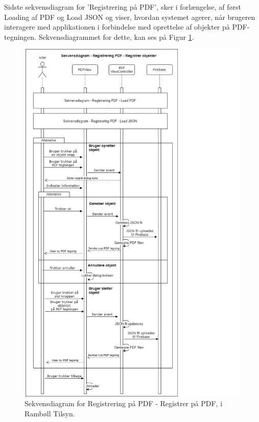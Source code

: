 Sidste sekvensdiagram for 'Registrering på PDF', sker i forlængelse, af først Loading af PDF og Load JSON og viser, hvordan systemet agerer, når brugeren interagere med applikationen i forbindelse med oprettelse af objekter på PDF-tegningen. Sekvensdiagrammet for dette, kan ses på Figur \ref{fig:RegistrerObjekterSekvensDiagram}.
\begin{figure}[H] %
	\centering
	\includegraphics[height=18cm, width=15cm]{Design/Applikation/RegistrePDF/RegistrerObjekterSekvensDiagram}
	\caption{Sekvensdiagram for Registrering på PDF - Registrer på PDF, i Rambøll Tilsyn.}
	\label{fig:RegistrerObjekterSekvensDiagram}
\end{figure}

\clearpage

